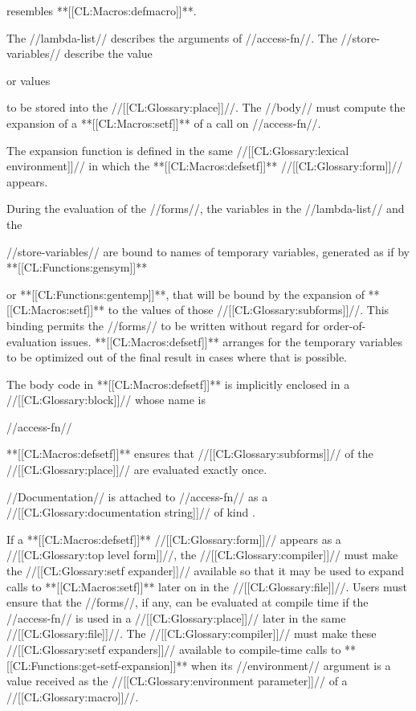 resembles **[[CL:Macros:defmacro]]**.

The //lambda-list// describes the arguments of //access-fn//. The //store-variables// describe the value

or values

to be stored into the //[[CL:Glossary:place]]//. The //body// must compute the expansion of a **[[CL:Macros:setf]]** of a call on //access-fn//.

The expansion function is defined in the same //[[CL:Glossary:lexical environment]]// in which the **[[CL:Macros:defsetf]]** //[[CL:Glossary:form]]// appears.

During the evaluation of the //forms//, the variables in the //lambda-list// and the

//store-variables// are bound to names of temporary variables, generated as if by **[[CL:Functions:gensym]]**

or **[[CL:Functions:gentemp]]**, that will be bound by the expansion of **[[CL:Macros:setf]]** to the values of those //[[CL:Glossary:subforms]]//. This binding permits the //forms// to be written without regard for order-of-evaluation issues. **[[CL:Macros:defsetf]]** arranges for the temporary variables to be optimized out of the final result in cases where that is possible.

The body code in **[[CL:Macros:defsetf]]** is implicitly enclosed in a //[[CL:Glossary:block]]// whose name is

//access-fn//

**[[CL:Macros:defsetf]]** ensures that //[[CL:Glossary:subforms]]// of the //[[CL:Glossary:place]]// are evaluated exactly once.

//Documentation// is attached to //access-fn// as a //[[CL:Glossary:documentation string]]// of kind .

If a **[[CL:Macros:defsetf]]** //[[CL:Glossary:form]]// appears as a //[[CL:Glossary:top level form]]//, the //[[CL:Glossary:compiler]]// must make the //[[CL:Glossary:setf expander]]// available so that it may be used to expand calls to **[[CL:Macros:setf]]** later on in the //[[CL:Glossary:file]]//. Users must ensure that the //forms//, if any, can be evaluated at compile time if the //access-fn// is used in a //[[CL:Glossary:place]]// later in the same //[[CL:Glossary:file]]//. The //[[CL:Glossary:compiler]]// must make these //[[CL:Glossary:setf expanders]]// available to compile-time calls to **[[CL:Functions:get-setf-expansion]]** when its //environment// argument is a value received as the //[[CL:Glossary:environment parameter]]// of a //[[CL:Glossary:macro]]//.

